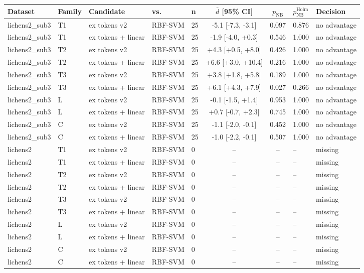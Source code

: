 \small
\begin{tabular}{lllllccl}
\toprule
Dataset & Family & Candidate & vs. & n & $\bar d$ [95\% CI] & $p_{\mathrm{NB}}$ & $p_{\mathrm{NB}}^{\mathrm{Holm}}$ & Decision \\
\midrule
lichens2_sub3 & T1 & ex tokens v2 & RBF-SVM & 25 & -5.1 [-7.3, -3.1] & 0.097 & 0.876 & no advantage \\
lichens2_sub3 & T1 & ex tokens + linear & RBF-SVM & 25 & -1.9 [-4.0, +0.3] & 0.546 & 1.000 & no advantage \\
lichens2_sub3 & T2 & ex tokens v2 & RBF-SVM & 25 & +4.3 [+0.5, +8.0] & 0.426 & 1.000 & no advantage \\
lichens2_sub3 & T2 & ex tokens + linear & RBF-SVM & 25 & +6.6 [+3.0, +10.4] & 0.216 & 1.000 & no advantage \\
lichens2_sub3 & T3 & ex tokens v2 & RBF-SVM & 25 & +3.8 [+1.8, +5.8] & 0.189 & 1.000 & no advantage \\
lichens2_sub3 & T3 & ex tokens + linear & RBF-SVM & 25 & +6.1 [+4.3, +7.9] & 0.027 & 0.266 & no advantage \\
lichens2_sub3 & L & ex tokens v2 & RBF-SVM & 25 & -0.1 [-1.5, +1.4] & 0.953 & 1.000 & no advantage \\
lichens2_sub3 & L & ex tokens + linear & RBF-SVM & 25 & +0.7 [-0.7, +2.3] & 0.745 & 1.000 & no advantage \\
lichens2_sub3 & C & ex tokens v2 & RBF-SVM & 25 & -1.1 [-2.0, -0.1] & 0.452 & 1.000 & no advantage \\
lichens2_sub3 & C & ex tokens + linear & RBF-SVM & 25 & -1.0 [-2.2, -0.1] & 0.507 & 1.000 & no advantage \\
lichens2 & T1 & ex tokens v2 & RBF-SVM & 0 & -- & -- & -- & missing \\
lichens2 & T1 & ex tokens + linear & RBF-SVM & 0 & -- & -- & -- & missing \\
lichens2 & T2 & ex tokens v2 & RBF-SVM & 0 & -- & -- & -- & missing \\
lichens2 & T2 & ex tokens + linear & RBF-SVM & 0 & -- & -- & -- & missing \\
lichens2 & T3 & ex tokens v2 & RBF-SVM & 0 & -- & -- & -- & missing \\
lichens2 & T3 & ex tokens + linear & RBF-SVM & 0 & -- & -- & -- & missing \\
lichens2 & L & ex tokens v2 & RBF-SVM & 0 & -- & -- & -- & missing \\
lichens2 & L & ex tokens + linear & RBF-SVM & 0 & -- & -- & -- & missing \\
lichens2 & C & ex tokens v2 & RBF-SVM & 0 & -- & -- & -- & missing \\
lichens2 & C & ex tokens + linear & RBF-SVM & 0 & -- & -- & -- & missing \\
\bottomrule
\end{tabular}
